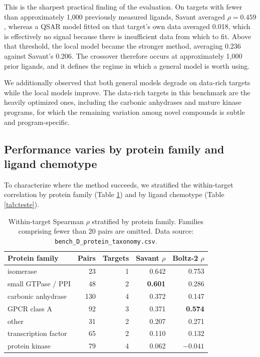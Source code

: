 \documentclass[11pt]{article}
\begin{document}
This is the sharpest practical finding of the evaluation. On targets with fewer
than approximately 1,000 previously measured ligands, Savant averaged
$\rho = 0.459$, whereas a QSAR model fitted on that target's own data averaged
0.018, which is effectively no signal because there is insufficient data from
which to fit. Above that threshold, the local model became the stronger method,
averaging 0.236 against Savant's 0.206. The crossover therefore occurs at
approximately 1,000 prior ligands, and it defines the regime in which a general
model is worth using.

We additionally observed that both general models degrade on data-rich targets
while the local models improve. The data-rich targets in this benchmark are the
heavily optimized ones, including the carbonic anhydrases and mature kinase
programs, for which the remaining variation among novel compounds is subtle and
program-specific.

\subsection{Performance varies by protein family and ligand chemotype}

To characterize where the method succeeds, we stratified the within-target
correlation by protein family (Table \ref{tab:testd}) and by ligand chemotype
(Table \ref{tab:teste}).

\begin{table}[H]
\centering
\caption{Within-target Spearman $\rho$ stratified by protein family. Families
comprising fewer than 20 pairs are omitted. Data source:
\texttt{bench\_D\_protein\_taxonomy.csv}.}
\label{tab:testd}
\begin{tabular}{lrrrr}
\toprule
Protein family & Pairs & Targets & Savant $\rho$ & Boltz-2 $\rho$ \\
\midrule
isomerase           & 23  & 1 & 0.642 & 0.753 \\
small GTPase / PPI  & 48  & 2 & \textbf{0.601} & 0.286 \\
carbonic anhydrase  & 130 & 4 & 0.372 & 0.147 \\
GPCR class A        & 92  & 3 & 0.371 & \textbf{0.574} \\
other               & 31  & 2 & 0.207 & 0.271 \\
transcription factor& 65  & 2 & 0.110 & 0.132 \\
protein kinase      & 79  & 4 & 0.062 & $-0.041$ \\
\bottomrule
\end{tabular}
\end{table}
\end{document}
